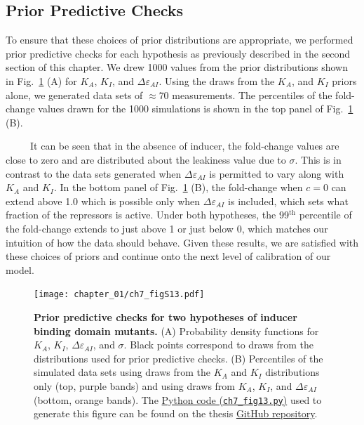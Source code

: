 \documentclass[12pt]{caltech_thesis}
\begin{document}
\hypertarget{prior-predictive-checks-2}{%
\subsection{Prior Predictive Checks}\label{prior-predictive-checks-2}}

To ensure that these choices of prior distributions are appropriate, we
performed prior predictive checks for each hypothesis as previously
described in the second section of this chapter. We drew 1000 values
from the prior distributions shown in
Fig.~\ref{fig:ind_prior_predictive} (A) for \(K_A\), \(K_I\), and
\(\Delta\varepsilon_{AI}\). Using the draws from the \(K_A\), and
\(K_I\) priors alone, we generated data sets of \(\approx 70\)
measurements. The percentiles of the fold-change values drawn for the
1000 simulations is shown in the top panel of
Fig.~\ref{fig:ind_prior_predictive} (B).

~~~~~It can be seen that in the absence of inducer, the fold-change
values are close to zero and are distributed about the leakiness value
due to \(\sigma\). This is in contrast to the data sets generated when
\(\Delta\varepsilon_{AI}\) is permitted to vary along with \(K_A\) and
\(K_I\). In the bottom panel of Fig.~\ref{fig:ind_prior_predictive} (B),
the fold-change when \(c = 0\) can extend above 1.0 which is possible
only when \(\Delta\varepsilon_{AI}\) is included, which sets what
fraction of the repressors is active. Under both hypotheses, the
99\(^\text{th}\) percentile of the fold-change extends to just above 1
or just below 0, which matches our intuition of how the data should
behave. Given these results, we are satisfied with these choices of
priors and continue onto the next level of calibration of our model.

\hypertarget{fig:ind_prior_predictive}{%
\begin{figure}
\centering
\texttt{[image: chapter\_01/ch7\_figS13.pdf]}
\caption[{Prior predictive checks for two hypotheses of inducer binding
domain mutants.}]{\textbf{Prior predictive checks for two hypotheses of
inducer binding domain mutants.} (A) Probability density functions for
\(K_A\), \(K_I\), \(\Delta\varepsilon_{AI}\), and \(\sigma\). Black
points correspond to draws from the distributions used for prior
predictive checks. (B) Percentiles of the simulated data sets using
draws from the \(K_A\) and \(K_I\) distributions only (top, purple
bands) and using draws from \(K_A\), \(K_I\), and
\(\Delta\varepsilon_{AI}\) (bottom, orange bands). The
\href{https://github.com/gchure/phd/blob/master/src/chapter_07/code/ch7_figS13.py}{Python
code (\texttt{ch7\_fig13.py})} used to generate this figure can be found
on the thesis \href{https://github.com/gchure/phd}{GitHub repository}.}
\label{fig:ind_prior_predictive}
\end{figure}
}
\end{document}

